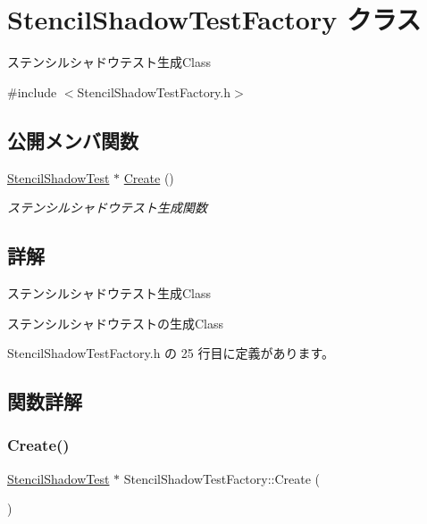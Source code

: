 \hypertarget{class_stencil_shadow_test_factory}{}\section{Stencil\+Shadow\+Test\+Factory クラス}
\label{class_stencil_shadow_test_factory}


ステンシルシャドウテスト生成\+Class  




{\ttfamily \#include $<$Stencil\+Shadow\+Test\+Factory.\+h$>$}

\subsection*{公開メンバ関数}
\begin{DoxyCompactItemize}
\item 
\mbox{\hyperlink{class_stencil_shadow_test}{Stencil\+Shadow\+Test}} $\ast$ \mbox{\hyperlink{class_stencil_shadow_test_factory_a4f6759798db8110e23bb1536b43393e1}{Create}} ()
\begin{DoxyCompactList}\small\item\em ステンシルシャドウテスト生成関数 \end{DoxyCompactList}\end{DoxyCompactItemize}


\subsection{詳解}
ステンシルシャドウテスト生成\+Class 

ステンシルシャドウテストの生成\+Class 

 Stencil\+Shadow\+Test\+Factory.\+h の 25 行目に定義があります。



\subsection{関数詳解}
\mbox{\label{class_stencil_shadow_test_factory_a4f6759798db8110e23bb1536b43393e1}} 
\subsubsection{\texorpdfstring{Create()}{Create()}}
{\footnotesize\ttfamily \mbox{\hyperlink{class_stencil_shadow_test}{Stencil\+Shadow\+Test}} $\ast$ Stencil\+Shadow\+Test\+Factory\+::\+Create (\begin{DoxyParamCaption}{ }\end{DoxyParamCaption})}




